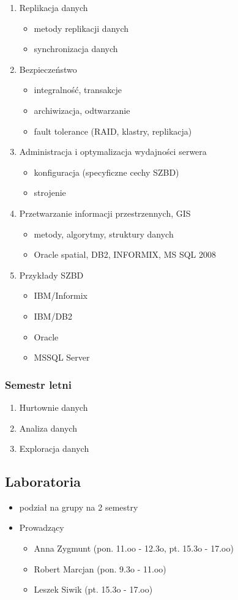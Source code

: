 \documentclass[12pt]{article}
\begin{document}
\begin{enumerate}
\item Replikacja danych
\begin{itemize}
\item metody replikacji danych
\item synchronizacja danych
\end{itemize}
\item Bezpieczeństwo
\begin{itemize}
\item integralność, transakcje
\item archiwizacja, odtwarzanie
\item fault tolerance (RAID, klastry, replikacja)
\end{itemize}
\item Administracja i optymalizacja wydajności serwera
\begin{itemize}
\item konfiguracja (specyficzne cechy SZBD)
\item strojenie
\end{itemize}
\item Przetwarzanie informacji przestrzennych, GIS
\begin{itemize}
\item metody, algorytmy, struktury danych
\item Oracle spatial, DB2, INFORMIX, MS SQL 2008
\end{itemize}
\item Przykłady SZBD
\begin{itemize}
\item IBM/Informix
\item IBM/DB2
\item Oracle
\item MSSQL Server
\end{itemize}
\end{enumerate}

\subsubsection{Semestr letni}
\begin{enumerate}
\item Hurtownie danych
\item Analiza danych
\item Exploracja danych
\end{enumerate}

\subsection{Laboratoria}
\begin{itemize}
\item podział na grupy na 2 semestry
\item Prowadzący
\begin{itemize}
\item Anna Zygmunt (pon. 11.oo - 12.3o, pt. 15.3o - 17.oo)
\item Robert Marcjan (pon. 9.3o - 11.oo)
\item Leszek Siwik (pt. 15.3o - 17.oo)
\end{itemize}
\end{itemize}
\end{document}
